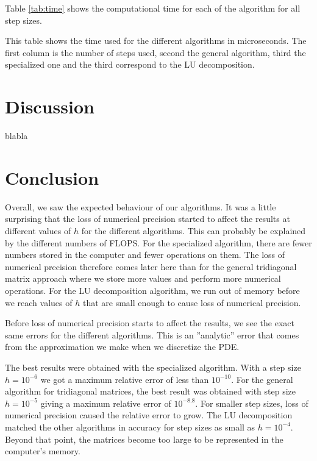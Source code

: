 \documentclass[reprint, english,notitlepage]{revtex4-1}  %
\begin{document}
Table \ref{tab:time} shows the computational time for each of the algorithm for all step sizes.

\begin{table}  %
  
  \caption{This table shows the time used for the different algorithms in microseconds. The first column is the number of steps used, second the general algorithm, third the specialized one and the third correspond to the LU decomposition.}
	\label{tab:time}
\end{table}



\section{Discussion}

blabla



\section{Conclusion}

Overall, we saw the expected behaviour of our algorithms. It was a little surprising that the loss of numerical precision started to affect the results at different values of $h$ for the different algorithms. This can probably be explained by the different numbers of FLOPS. For the specialized algorithm, there are fewer numbers stored in the computer and fewer operations on them. The loss of numerical precision therefore comes later here than for the general tridiagonal matrix approach where we store more values and perform more numerical operations. For the LU decomposition algorithm, we run out of memory before we reach values of $h$ that are small enough to cause loss of numerical precision.

Before loss of numerical precision starts to affect the results, we see the exact same errors for the different algorithms. This is an ''analytic'' error that comes from the approximation we make when we discretize the PDE.

The best results were obtained with the specialized algorithm. With a step size $h = 10^{-6}$ we got a maximum relative error of less than $10^{-10}$. For the general algorithm for tridiagonal matrices, the best result was obtained with step size $h = 10^{-5}$ giving a maximum relative error of $10^{-8.8}$. For smaller step sizes, loss of numerical precision caused the relative error to grow. The LU decomposition matched the other algorithms in accuracy for step sizes as small as $h = 10^{-4}$. Beyond that point, the matrices become too large to be represented in the computer's memory.
\end{document}
